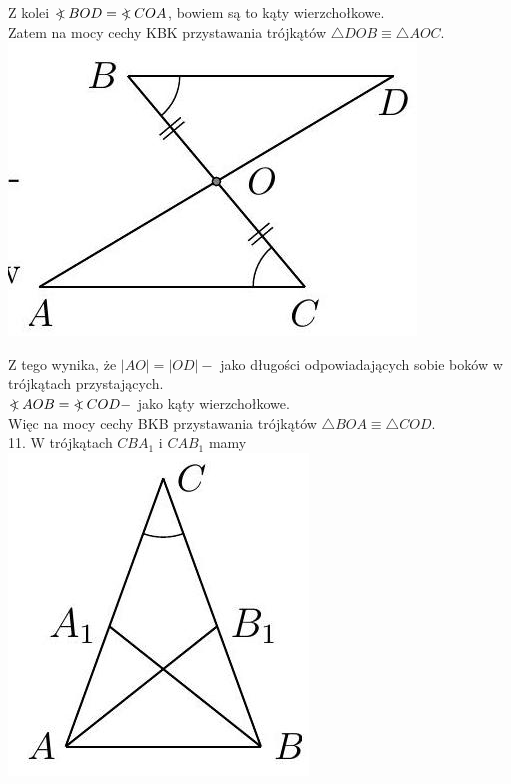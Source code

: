 \documentclass[10pt]{article}
\newcommand\Varangle{\mathop{{<\!\!\!\!\!\text{\small)}}\:}\nolimits}
\begin{document}
Z kolei \(\Varangle B O D=\Varangle C O A\), bowiem są to kąty wierzchołkowe.\\
Zatem na mocy cechy KBK przystawania trójkątów \(\triangle D O B \equiv \triangle A O C\).\\
\includegraphics[max width=\textwidth, center]{2024_11_21_71f62bd117d375398909g-060}

Z tego wynika, że \(|A O|=|O D|-\) jako długości odpowiadających sobie boków w trójkątach przystających.\\
\(\Varangle A O B=\Varangle C O D-\) jako kąty wierzchołkowe.\\
Więc na mocy cechy BKB przystawania trójkątów \(\triangle B O A \equiv \triangle C O D\).\\
11. W trójkątach \(C B A_{1}\) i \(C A B_{1}\) mamy\\
\includegraphics[max width=\textwidth, center]{2024_11_21_71f62bd117d375398909g-061}
\end{document}
